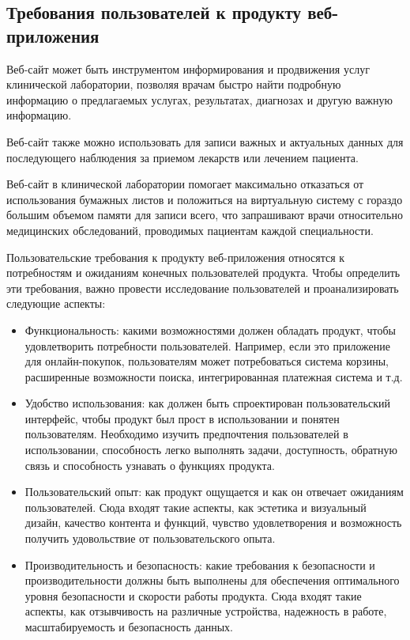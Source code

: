 \subsection{Требования пользователей к продукту веб-приложения}

Веб-сайт может быть инструментом информирования и продвижения услуг клинической лаборатории, позволяя врачам быстро найти подробную информацию о предлагаемых услугах, результатах, диагнозах и другую важную информацию.

Веб-сайт также можно использовать для записи важных и актуальных данных для последующего наблюдения за приемом лекарств или лечением пациента.

Веб-сайт в клинической лаборатории помогает максимально отказаться от использования бумажных листов и положиться на виртуальную систему с гораздо большим объемом памяти для записи всего, что запрашивают врачи относительно медицинских обследований, проводимых пациентам каждой специальности.

Пользовательские требования к продукту веб-приложения относятся к потребностям и ожиданиям конечных пользователей продукта. Чтобы определить эти требования, важно провести исследование пользователей и проанализировать следующие аспекты:

\begin{itemize}
	\item Функциональность: какими возможностями должен обладать продукт, чтобы удовлетворить потребности пользователей. Например, если это приложение для онлайн-покупок, пользователям может потребоваться система корзины, расширенные возможности поиска, интегрированная платежная система и т.д.
	\item Удобство использования: как должен быть спроектирован пользовательский интерфейс, чтобы продукт был прост в использовании и понятен пользователям. Необходимо изучить предпочтения пользователей в использовании, способность легко выполнять задачи, доступность, обратную связь и способность узнавать о функциях продукта.
	\item Пользовательский опыт: как продукт ощущается и как он отвечает ожиданиям пользователей. Сюда входят такие аспекты, как эстетика и визуальный дизайн, качество контента и функций, чувство удовлетворения и возможность получить удовольствие от пользовательского опыта.
	\item Производительность и безопасность: какие требования к безопасности и производительности должны быть выполнены для обеспечения оптимального уровня безопасности и скорости работы продукта. Сюда входят такие аспекты, как отзывчивость на различные устройства, надежность в работе, масштабируемость и безопасность данных.
\end{itemize}

